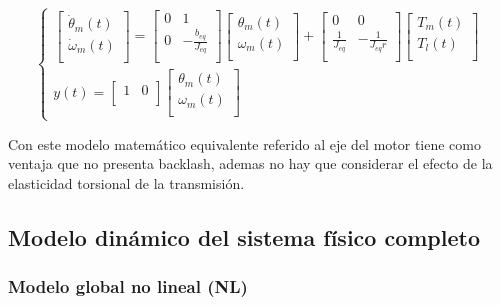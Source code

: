 \documentclass{article}
\begin{document}
\begin{equation}
\begin{cases}
    \begin{bmatrix}
        \dot{\theta}_{m}(t)\\
        \dot{\omega}_{m}(t)\\
    \end{bmatrix}
    =
    \begin{bmatrix}
        0 & 1\\
        0 & -\frac{b_{eq}}{J_{eq}}\\
    \end{bmatrix}
    \begin{bmatrix}
        \theta_{m}(t)\\
        \omega_{m}(t)\\
    \end{bmatrix}
    +
    \begin{bmatrix}
        0 & 0\\
        \frac{1}{J_{eq}} & -\frac{1}{J_{eq}r}\\
    \end{bmatrix}
    \begin{bmatrix}
        T_{m}(t)\\
        T_{l}(t)\\
    \end{bmatrix}\\
    y(t) = 
    \begin{bmatrix} 1 & 0\\ \end{bmatrix} 
    \begin{bmatrix} \theta_{m}(t)\\ \omega_{m}(t)\\ \end{bmatrix}
\end{cases}
\end{equation}

Con este modelo matemático equivalente referido al eje del motor tiene como 
ventaja que no presenta backlash, ademas no hay que considerar el efecto de 
la elasticidad torsional de la transmisión.

\subsection*{Modelo dinámico del sistema físico completo}
\subsubsection*{Modelo global no lineal (NL)}
\end{document}
